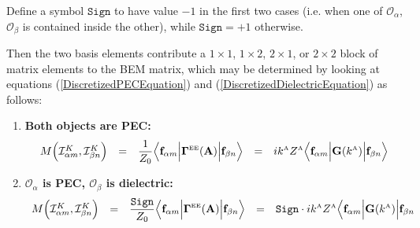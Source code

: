 \documentclass[letterpaper]{article}
\begin{document}
Define a symbol $\texttt{Sign}$ to have value $-1$ in the first
two cases (i.e. when one of $\mathcal{O}_\alpha$, $\mathcal{O}_\beta$
is contained inside the other), while $\texttt{Sign}=+1$ otherwise.

Then the two basis elements contribute a 
$1\times 1$, $1\times 2$, $2\times 1$, or $2\times 2$
block of matrix elements to the BEM matrix, which may be determined
by looking at equations 
(\ref{DiscretizedPECEquation}) 
and 
(\ref{DiscretizedDielectricEquation}) 
as follows:
\begin{enumerate}
\item \textbf{Both objects are PEC:}
$$\begin{array}{lclcl}
   M\Big( \mathcal{I}^K_{\alpha m}, \mathcal{I}^K_{\beta n} \Big) 
  &=&
  \displaystyle{ \frac{1}{Z_0} 
                 \Big\langle 
                 \mathbf{f}_{\alpha m} 
                 \Big| \boldsymbol{\Gamma}^{\hbox{\tiny{EE}}}(\mathbf{A}) \Big|
                 \mathbf{f}_{\beta n} 
                 \Big\rangle
               }
  &=&
  \displaystyle{
  ik^{\hbox{\tiny{A}}} Z^{\hbox{\tiny{A}}}
                \Big\langle 
                \mathbf{f}_{\alpha m} 
                \Big| \mathbf{G}(k^{\hbox{\tiny{A}}}) \Big|
                \mathbf{f}_{\beta n} 
                \Big\rangle
               }
\end{array}$$
\item \textbf{ $\mathcal{O}_\alpha$ is PEC, 
               $\mathcal{O}_\beta$ is dielectric:}
$$\begin{array}{lclcl}
 M\Big( \mathcal{I}^K_{\alpha m}, \mathcal{I}^K_{\beta n} \Big) 
  &=& 
  \displaystyle{ \frac{\texttt{Sign}}{Z_0} 
                 \Big\langle \mathbf{f}_{\alpha m} 
                 \Big| \boldsymbol{\Gamma}^{\hbox{\tiny{EE}}}(\mathbf{A}) \Big|
                 \mathbf{f}_{\beta n} 
                 \Big\rangle
               }
  &=&
  \displaystyle{ \texttt{Sign}\cdot ik^{\hbox{\tiny{A}}} Z^{\hbox{\tiny{A}}}
                 \Big\langle \mathbf{f}_{\alpha m} 
                 \Big| \mathbf{G}(k^{\hbox{\tiny{A}}}) \Big|
                 \mathbf{f}_{\beta n} 
}
\end{array}$$
\end{enumerate}
\end{document}
